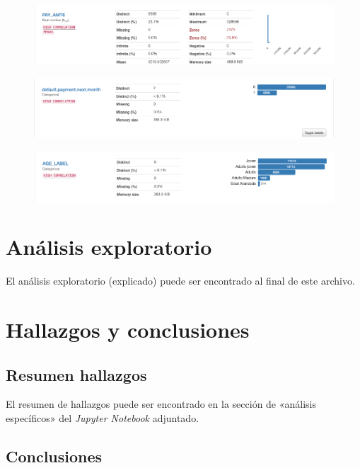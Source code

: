 \begin{figure}[H]
	\centering
	\includegraphics[scale=0.4]{Images/25}
\end{figure}
\begin{figure}[H]
	\centering
	\includegraphics[scale=0.4]{Images/26}
\end{figure}
\begin{figure}[H]
	\centering
	\includegraphics[scale=0.4]{Images/27}
\end{figure}


\section{Análisis exploratorio}

El análisis exploratorio (explicado) puede ser encontrado  al final de este archivo.
\section{Hallazgos y conclusiones}

\subsection{Resumen hallazgos}
El resumen de hallazgos puede ser encontrado en la sección de «análisis específicos» del \textit{Jupyter Notebook} adjuntado. 

\subsection{Conclusiones}

